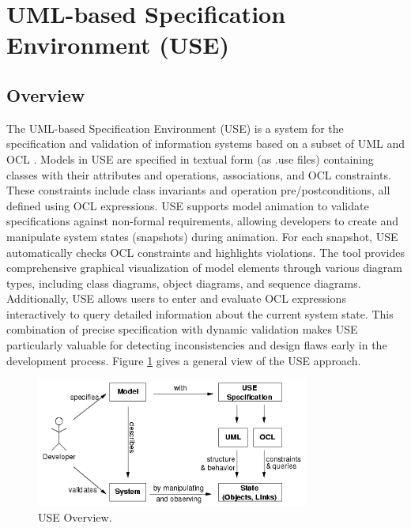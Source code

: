 \section{UML-based Specification Environment (USE)}

\subsection{Overview}
The UML-based Specification Environment (USE) is a system for the specification and 
validation of information systems based on a subset of UML and OCL \cite{USE}. 
Models in USE are specified in textual form (as .use files) containing classes with 
their attributes and operations, associations, and OCL constraints. These constraints 
include class invariants and operation pre/postconditions, all defined using OCL 
expressions. USE supports model animation to validate specifications against 
non-formal requirements, allowing developers to create and manipulate system states 
(snapshots) during animation. For each snapshot, USE automatically checks OCL 
constraints and highlights violations. The tool provides comprehensive graphical 
visualization of model elements through various diagram types, including class 
diagrams, object diagrams, and sequence diagrams. Additionally, USE allows users 
to enter and evaluate OCL expressions interactively to query detailed information 
about the current system state. This combination of precise specification with 
dynamic validation makes USE particularly valuable for detecting inconsistencies 
and design flaws early in the development process. Figure \ref{fig:use_overview}
gives a general view of the USE approach.

\begin{figure}
    \centering
    \includegraphics[width=0.8\textwidth]{figures/c1/USE_Overview.png}
    \caption{USE Overview.}
    \label{fig:use_overview}
\end{figure}

